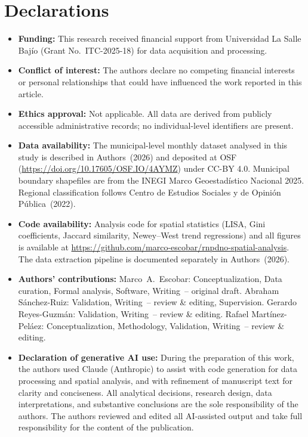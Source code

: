 \documentclass[pdflatex,sn-mathphys-num]{sn-jnl}
\begin{document}
\section*{Declarations}
\begin{itemize}
\item \textbf{Funding:} This research received financial support from 
Universidad La Salle Baj\'{i}o (Grant No.\ ITC-2025-18) for data 
acquisition and processing.

\item \textbf{Conflict of interest:} The authors declare no competing 
financial interests or personal relationships that could have 
influenced the work reported in this article.

\item \textbf{Ethics approval:} Not applicable. All data are derived 
from publicly accessible administrative records; no individual-level 
identifiers are present.

\item \textbf{Data availability:} The municipal-level monthly dataset 
analysed in this study is described in Authors~(2026) and deposited 
at OSF (\url{https://doi.org/10.17605/OSF.IO/4AYMZ}) under CC-BY 
4.0. Municipal boundary shapefiles are from the INEGI Marco 
Geoestad\'{i}stico Nacional 2025. Regional classification follows 
Centro de Estudios Sociales y de Opini\'{o}n P\'{u}blica~(2022).

\item \textbf{Code availability:} Analysis code for spatial 
statistics (LISA, Gini coefficients, Jaccard similarity, Newey--West 
trend regressions) and all figures is available at 
\url{https://github.com/marco-escobar/rnpdno-spatial-analysis}. 
The data extraction pipeline is documented separately in 
Authors~(2026).

\item \textbf{Authors' contributions:} Marco~A.\ Escobar: Conceptualization, Data curation, Formal analysis, 
Software, Writing~-- original draft. 
Abraham Sánchez-Ruiz: Validation, Writing~-- review \& editing, Supervision. 
Gerardo Reyes-Guzmán: Validation, Writing~-- review \& editing. 
Rafael Martínez-Peláez: Conceptualization, Methodology, Validation, 
Writing~-- review \& editing.

\item \textbf{Declaration of generative AI use:} During the 
preparation of this work, the authors used Claude (Anthropic) to 
assist with code generation for data processing and spatial analysis, 
and with refinement of manuscript text for clarity and conciseness. 
All analytical decisions, research design, data interpretations, and 
substantive conclusions are the sole responsibility of the authors. 
The authors reviewed and edited all AI-assisted output and take full 
responsibility for the content of the publication.
\end{itemize}

\begin{appendices}

\end{appendices}


\end{document}
